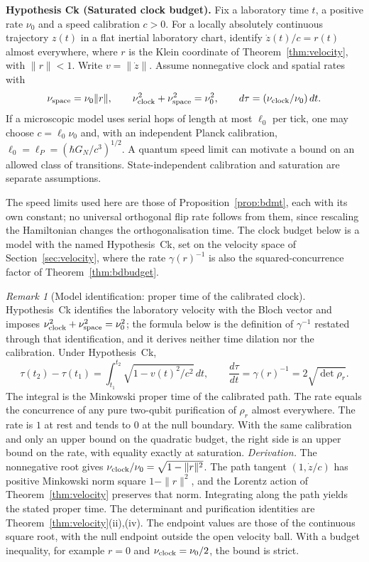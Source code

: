 \documentclass[aps,pra,onecolumn,superscriptaddress,nofootinbib,10pt]{revtex4-2}
\theoremstyle{definition}
\theoremstyle{remark}
\newtheorem{remark}[theorem]{Remark}
\begin{document}
\smallskip\noindent\textbf{Hypothesis Ck (Saturated clock budget).}\label{hyp:Ck}  Fix a laboratory time $t$, a positive rate $\nu_0$ and a speed
calibration $c>0$. For a locally absolutely continuous trajectory
$z(t)$ in a flat inertial laboratory chart, identify
$\dot z(t)/c=r(t)$ almost everywhere, where $r$ is the Klein coordinate
of Theorem~\ref{thm:velocity}, with $\|r\|<1$. Write $v=\|\dot z\|$.
Assume nonnegative clock and spatial rates with
\[
 \nu_{\rm space}=\nu_0\|r\|,\qquad
 \nu_{\rm clock}^2+\nu_{\rm space}^2=\nu_0^2,\qquad
 d\tau=(\nu_{\rm clock}/\nu_0)\,dt .
\]
If a microscopic model uses serial hops of length at most $\ell_0$
per tick, one may choose $c=\ell_0\nu_0$ and, with an independent
Planck calibration, $\ell_0=\ell_P=(\hbar G_N/c^3)^{1/2}$.
A quantum speed limit can motivate a bound on an allowed class of
transitions. State-independent calibration and saturation are
separate assumptions.


\noindent The speed limits used here are those of Proposition~\ref{prop:bdmt}, each with its own constant; no
universal orthogonal flip rate follows from them, since rescaling the Hamiltonian changes the
orthogonalisation time.  The clock budget below is a model with the named Hypothesis~Ck, set on the velocity
space of Section~\ref{sec:velocity}, where the rate $\gamma(r)^{-1}$ is also the squared-concurrence factor of
Theorem~\ref{thm:bdbudget}.

\begin{remark}[Model identification: proper time of the calibrated clock]\label{ub:clock}
Hypothesis~Ck identifies the laboratory velocity with the Bloch vector and imposes
$\nu_{\rm clock}^2+\nu_{\rm space}^2=\nu_0^2$; the formula below is the definition of $\gamma^{-1}$ restated through that
identification, and it derives neither time dilation nor the calibration.  Under Hypothesis~Ck,
\[
 \tau(t_2)-\tau(t_1)
 =\int_{t_1}^{t_2}\sqrt{1-v(t)^2/c^2}\,dt,\qquad
 \frac{d\tau}{dt}=\gamma(r)^{-1}=2\sqrt{\det\rho_r}.
\]
The integral is the Minkowski proper time of the calibrated path.
The rate equals the concurrence of any pure two-qubit purification
of $\rho_r$ almost everywhere. The rate is $1$ at rest and tends to $0$ at the
null boundary. With the same calibration and only an upper bound
on the quadratic budget, the right side is an upper bound on the
rate, with equality exactly at saturation.
\emph{Derivation.}  The nonnegative root gives $\nu_{\rm clock}/\nu_0
=\sqrt{1-\|r\|^2}$. The path tangent $(1,\dot z/c)$ has positive
Minkowski norm square $1-\|r\|^2$, and the Lorentz action of
Theorem~\ref{thm:velocity} preserves that norm. Integrating along
the path yields the stated proper time. The determinant and
purification identities are Theorem~\ref{thm:velocity}(ii),(iv).
The endpoint values are those of the continuous square root, with
the null endpoint outside the open velocity ball. With a budget
inequality, for example $r=0$ and $\nu_{\rm clock}=\nu_0/2$,
the bound is strict.
\end{remark}
\end{document}
